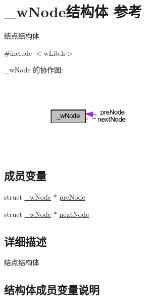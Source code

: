 \hypertarget{struct__w_node}{}\section{\+\_\+w\+Node结构体 参考}
\label{struct__w_node}


结点结构体  




{\ttfamily \#include $<$w\+Lib.\+h$>$}



\+\_\+w\+Node 的协作图\+:
\nopagebreak
\begin{figure}[H]
\begin{center}
\leavevmode
\includegraphics[width=191pt]{struct__w_node__coll__graph}
\end{center}
\end{figure}
\subsection*{成员变量}
\begin{DoxyCompactItemize}
\item 
struct \mbox{\hyperlink{struct__w_node}{\+\_\+w\+Node}} $\ast$ \mbox{\hyperlink{struct__w_node_abc26422bd712b569f20f912470cdca6d}{pre\+Node}}
\item 
struct \mbox{\hyperlink{struct__w_node}{\+\_\+w\+Node}} $\ast$ \mbox{\hyperlink{struct__w_node_a5a117484843cbaec00be972bb97d0752}{next\+Node}}
\end{DoxyCompactItemize}


\subsection{详细描述}
结点结构体 

\subsection{结构体成员变量说明}
\mbox{\label{struct__w_node_a5a117484843cbaec00be972bb97d0752}} 
